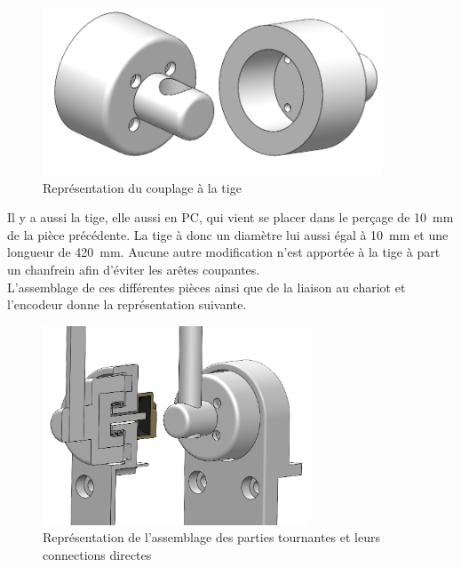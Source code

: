 \begin{figure}[H]
    \centering
    \includegraphics[width = 0.9\textwidth]{assets/figures/CouplageTige.png}
    \caption{Représentation du couplage à la tige}
    \label{fig:CouplTige}
\end{figure}

Il y a aussi la tige, elle aussi en \acrshort{PC}, qui vient se placer dans le perçage de 10~mm de la pièce précédente. La tige à donc un
diamètre lui aussi égal à 10~mm et une longueur de 420~mm. Aucune autre modification n'est apportée à la tige à part un chanfrein afin d'éviter
les arêtes coupantes.\\

L'assemblage de ces différentes pièces ainsi que de la liaison au chariot et l'encodeur donne la représentation suivante.

\begin{figure}[H]
    \centering
    \includegraphics[width = 0.7\textwidth]{assets/figures/AssemblagePartieTournante.png}
    \caption{Représentation de l'assemblage des parties tournantes et leurs connections directes}
    \label{fig:AssPartieTour}
\end{figure}


